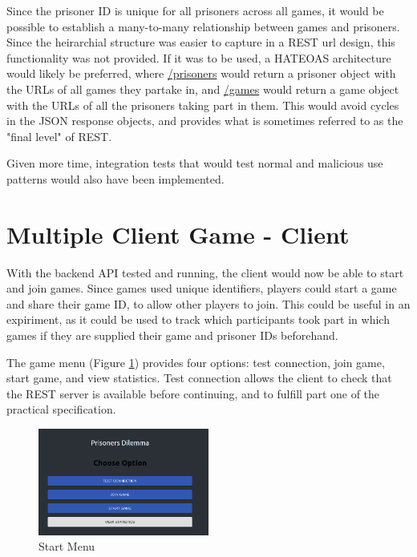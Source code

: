 \documentclass[12pt]{article}
\begin{document}
Since the prisoner ID is unique for all prisoners across all games, it would be possible to establish a many-to-many relationship between games and prisoners. Since the heirarchial structure was easier to capture in a REST url design, this functionality was not provided. If it was to be used, a HATEOAS architecture would likely be preferred, where \url{/prisoners} would return a prisoner object with the URLs of all games they partake in, and \url{/games} would return a game object with the URLs of all the prisoners taking part in them. This would avoid cycles in the JSON response objects, and provides what is sometimes referred to as the "final level" of REST.

Given more time, integration tests that would test normal and malicious use patterns would also have been implemented. 

\part{Multiple Client Game - Client}

With the backend API tested and running, the client would now be able to start and join games. Since games used unique identifiers, players could start a game and share their game ID, to allow other players to join. This could be useful in an expiriment, as it could be used to track which participants took part in which games if they are supplied their game and prisoner IDs beforehand. 

The game menu (Figure \ref{fig:startmenu}) provides four options: test connection, join game, start game, and view statistics. Test connection allows the client to check that the REST server is available before continuing, and to fulfill part one of the practical specification. 

\begin{figure}[!ht]
        \centering
        \includegraphics[width=0.5\textwidth]{images/menu} %
        \caption{Start Menu}
        \label{fig:startmenu}
\end{figure}
\end{document}
